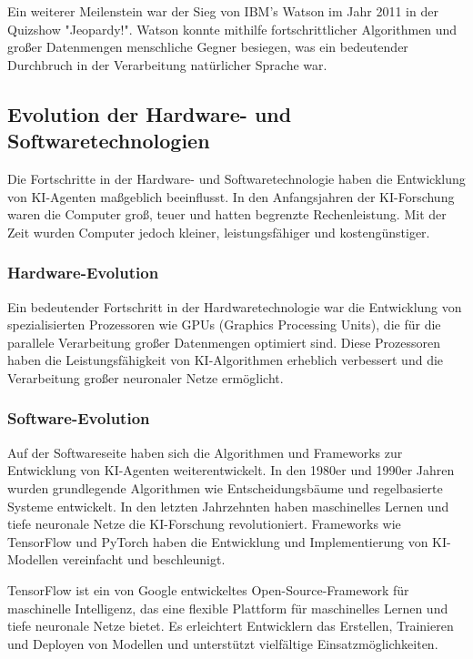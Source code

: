 \documentclass[conference]{IEEEtran}
\begin{document}
Ein weiterer Meilenstein war der Sieg von IBM's Watson im Jahr 2011 in der Quizshow "Jeopardy!". Watson konnte mithilfe fortschrittlicher Algorithmen und großer Datenmengen menschliche Gegner besiegen, was ein bedeutender Durchbruch in der Verarbeitung natürlicher Sprache war\cite{moto-oka_overview_1983}\cite{huang_history_2006}.

\subsection{Evolution der Hardware- und Softwaretechnologien}

Die Fortschritte in der Hardware- und Softwaretechnologie haben die Entwicklung von KI-Agenten maßgeblich beeinflusst. In den Anfangsjahren der KI-Forschung waren die Computer groß, teuer und hatten begrenzte Rechenleistung. Mit der Zeit wurden Computer jedoch kleiner, leistungsfähiger und kostengünstiger\cite{moto-oka_overview_1983}.

\subsubsection{Hardware-Evolution}
Ein bedeutender Fortschritt in der Hardwaretechnologie war die Entwicklung von spezialisierten Prozessoren wie GPUs (Graphics Processing Units), die für die parallele Verarbeitung großer Datenmengen optimiert sind. Diese Prozessoren haben die Leistungsfähigkeit von KI-Algorithmen erheblich verbessert und die Verarbeitung großer neuronaler Netze ermöglicht\cite{moto-oka_overview_1983}.

\subsubsection{Software-Evolution}
Auf der Softwareseite haben sich die Algorithmen und Frameworks zur Entwicklung von KI-Agenten weiterentwickelt. In den 1980er und 1990er Jahren wurden grundlegende Algorithmen wie Entscheidungsbäume und regelbasierte Systeme entwickelt. In den letzten Jahrzehnten haben maschinelles Lernen und tiefe neuronale Netze die KI-Forschung revolutioniert. Frameworks wie TensorFlow und PyTorch haben die Entwicklung und Implementierung von KI-Modellen vereinfacht und beschleunigt\cite{moto-oka_overview_1983}.

TensorFlow ist ein von Google entwickeltes Open-Source-Framework für maschinelle Intelligenz, das eine flexible Plattform für maschinelles Lernen und tiefe neuronale Netze bietet. Es erleichtert Entwicklern das Erstellen, Trainieren und Deployen von Modellen und unterstützt vielfältige Einsatzmöglichkeiten.
\cite{noauthor_161001178_nodate}
\end{document}

